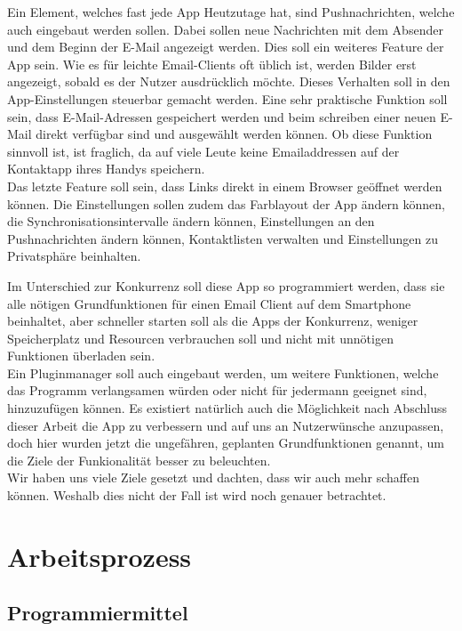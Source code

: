 \documentclass[a4paper,11pt]{article}
\begin{document}
Ein Element, welches fast jede App Heutzutage hat, sind Pushnachrichten, welche auch eingebaut werden sollen. Dabei sollen neue Nachrichten mit dem Absender und dem Beginn der E-Mail angezeigt werden. 
Dies soll ein weiteres Feature der App sein. Wie es für leichte Email-Clients oft üblich ist, werden Bilder erst angezeigt, sobald es der Nutzer ausdrücklich möchte. Dieses Verhalten soll in den App-Einstellungen steuerbar gemacht werden. Eine sehr praktische Funktion soll sein, dass E-Mail-Adressen gespeichert werden und beim schreiben einer neuen E-Mail direkt verfügbar sind und ausgewählt werden können. Ob diese Funktion sinnvoll ist, ist fraglich, da auf viele Leute keine Emailaddressen auf der Kontaktapp ihres Handys speichern.\\

Das letzte Feature soll sein, dass Links direkt in einem Browser geöffnet werden können. Die Einstellungen sollen zudem das Farblayout der App ändern können, die Synchronisationsintervalle ändern können, Einstellungen an den Pushnachrichten ändern können, Kontaktlisten verwalten und Einstellungen zu Privatsphäre beinhalten.


Im Unterschied zur Konkurrenz soll diese App so programmiert werden, dass sie alle nötigen Grundfunktionen für einen Email Client auf dem Smartphone beinhaltet, aber schneller starten soll als die Apps der Konkurrenz, weniger Speicherplatz und Resourcen verbrauchen soll und nicht mit unnötigen Funktionen überladen sein. \\


Ein Pluginmanager soll auch eingebaut werden, um weitere Funktionen, welche das Programm verlangsamen würden oder nicht für jedermann geeignet sind, hinzuzufügen können. Es existiert natürlich auch die Möglichkeit nach Abschluss dieser Arbeit die App zu verbessern und auf uns an Nutzerwünsche anzupassen, doch hier wurden jetzt die ungefähren, geplanten Grundfunktionen genannt, um die Ziele der Funkionalität besser zu beleuchten.\\
Wir haben uns viele Ziele gesetzt und dachten, dass wir auch mehr schaffen können. Weshalb dies nicht der Fall ist wird noch genauer betrachtet. 




\section{Arbeitsprozess}

\subsection{Programmiermittel}
\end{document}
